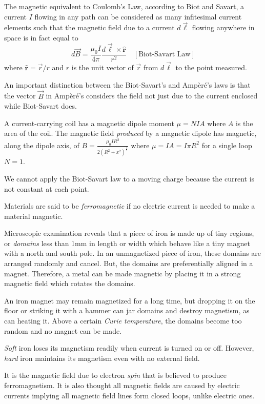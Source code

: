 \begin{remark}
    The magnetic equivalent to Coulomb's Law, according to Biot and Savart, a current $I$ flowing in any path can be considered as many infitesimal current elements such that the magnetic field due to a current $d\vec{\ell}$ flowing anywhere in space is in fact equal to $$d\vec{B} = \frac{\mu_0I}{4\pi}\frac{d\vec{\ell}\times\hat{\mathbf{r}}}{r^2} \quad [\text{Biot-Savart Law}]$$ where $\hat{\mathbf{r}} = \vec{r}/r$ and $r$ is the unit vector of $\vec{r}$ from $d\vec{\ell}$ to the point measured. 
\end{remark}
\begin{note}
    An important distinction between the Biot-Savart's and Ampèré's laws is that the vector $\vec{B}$ in Ampèré's considers the field not just due to the current enclosed while Biot-Savart does.
\end{note}
\begin{remark}
    A current-carrying coil has a magnetic dipole moment $\mu = NIA$ where $A$ is the area of the coil. The magnetic field \emph{produced} by a magnetic dipole has magnetic, along the dipole axis, of $B = \frac{\mu_0IR^2}{2(R^2+x^2)^\frac{3}{2}}$ where $\mu = IA = I\pi R^2$ for a single loop $N = 1$.
\end{remark}
\begin{note}
    We cannot apply the Biot-Savart law to a moving charge because the current is not constant at each point. 
\end{note}
\begin{definition}[Ferromagnetic]
    Materials are said to be \emph{ferromagnetic} if no electric current is needed to make a material magnetic.
\end{definition}
\begin{definition}[Domains]
    Microscopic examination reveals that a piece of iron is made up of tiny regions, or \emph{domains} less than 1mm in length or width which behave like a tiny magnet with a north and south pole. In an unmagnetized piece of iron, these domains are arranged randomly and cancel. But, the domains are preferentially aligned in a magnet. Therefore, a metal can be made magnetic by placing it in a strong magnetic field which rotates the domains.
\end{definition}
\begin{remark}
    An iron magnet may remain magnetized for a long time, but dropping it on the floor or striking it with a hammer can jar domains and destroy magnetism, as can heating it. Above a certain \emph{Curie temperature}, the domains become too random and no magnet can be made.

    \emph{Soft} iron loses its magnetism readily when current is turned on or off. However, \emph{hard} iron maintains its magnetism even with no external field.
\end{remark}
\begin{remark}
    It is the magnetic field due to electron \emph{spin} that is believed to produce ferromagnetism. It is also thought all magnetic fields are caused by electric currents implying all magnetic field lines form closed loops, unlike electric ones.
\end{remark}

